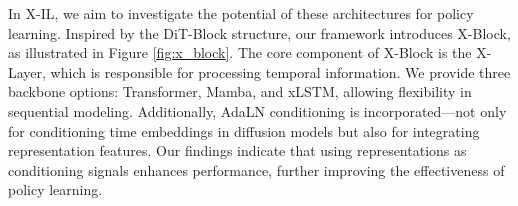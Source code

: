
In X-IL, we aim to investigate the potential of these architectures for policy learning. Inspired by the DiT-Block \cite{peebles2023scalable} structure, our framework introduces X-Block, as illustrated in Figure \ref{fig:x_block}. The core component of X-Block is the X-Layer, which is responsible for processing temporal information. We provide three backbone options: Transformer, Mamba, and xLSTM, allowing flexibility in sequential modeling. Additionally, AdaLN conditioning \cite{peebles2023scalable} is incorporated—not only for conditioning time embeddings in diffusion models but also for integrating representation features. Our findings indicate that using representations as conditioning signals enhances performance, further improving the effectiveness of policy learning.

